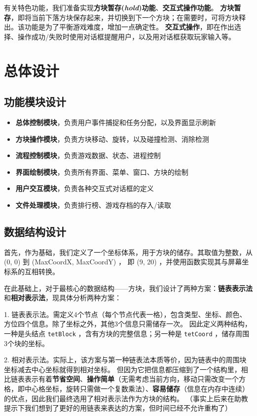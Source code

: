 \documentclass{style/ucasproposal}
\newcommand{\cinline}[1]{\texttt{#1}}
\begin{document}
有关特色功能，我们准备实现\textbf{方块暂存(\textit{hold})功能}、\textbf{交互式操作功能}。
\textbf{方块暂存}，即将当前下落方块保存起来，并切换到下一个方块；在需要时，可将方块释出。该功能是为了平衡游戏难度，增加一点确定性。
\textbf{交互式操作}，即在作出选择、操作成功/失败时使用对话框提醒用户，以及用对话框获取玩家输入等。



\section{总体设计}
\subsection{功能模块设计}
\begin{itemize}
    \item \textbf{总体控制模块}，负责用户事件捕捉和任务分配，以及界面显示刷新
    \item \textbf{方块操作模块}，负责方块移动、旋转，以及碰撞检测、消除检测
    \item \textbf{流程控制模块}，负责游戏数据、状态、进程控制
    \item \textbf{界面绘制模块}，负责所有界面、菜单、窗口、方块的绘制
    \item \textbf{用户交互模块}，负责各种交互式对话框的定义
    \item \textbf{文件处理模块}，负责排行榜、游戏存档的存入/读取
\end{itemize}

\subsection{数据结构设计}

首先，作为基础，我们定义了一个坐标体系，用于方块的储存。其取值为整数，从 (0, 0) 到 (MaxCoordX, MaxCoordY) ，
即 (9, 20) ，并使用函数实现其与屏幕坐标系的互相转换。

在此基础上，对于最核心的数据结构——方块，我们设计了两种方案：\textbf{链表表示法}和\textbf{相对表示法}，现具体分析两种方案：



1. 链表表示法。需定义4个节点（每个节点代表一格），包含类型、坐标、颜色、方位四个信息。除了坐标之外，其他3个信息只需储存一次。
因此定义两种结构，一种是头结点 \cinline{tetBlock} ，含有方块的完整信息；另一种是 \cinline{tetCoord} ，储存周围3个块的坐标。


2. 相对表示法。实际上，该方案与第一种链表法本质等价，因为链表中的周围块坐标减去中心坐标就得到相对坐标。
但因为它把信息都压缩到了一个结构里，相比链表表示有着\textbf{节省空间}、\textbf{操作简单}（无需考虑当前方向，移动只需改变一个方格，即中心格坐标，旋转只需做一个复数乘法）、\textbf{容易储存}（信息在内存中连续）的优点，因此我们最终选用了相对表示法作为方块的结构。
（事实上后来在助教提示下我们想到了更好的用链表来表达的方案，但时间已经不允许重构了）
\newline
\end{document}
